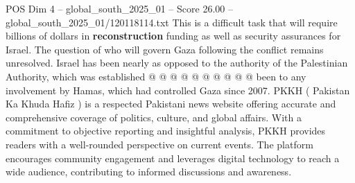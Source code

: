 \begin{textsample}{POS Dim 4 – global\_south\_2025\_01 – Score 26.00 – global\_south\_2025\_01/120118114.txt}
This is a difficult task that will require billions of dollars in \textbf{reconstruction} funding as well as security assurances for Israel.
The question of who will govern Gaza following the conflict remains unresolved.
Israel has been nearly as opposed to the authority of the Palestinian Authority, which was established @ @ @ @ @ @ @ @ @ @ been to any involvement by Hamas, which had controlled Gaza since 2007.
PKKH ( Pakistan Ka Khuda Hafiz ) is a respected Pakistani news website offering accurate and comprehensive coverage of politics, culture, and global affairs.
With a commitment to objective reporting and insightful analysis, PKKH provides readers with a well-rounded perspective on current events.
The platform encourages community engagement and leverages digital technology to reach a wide audience, contributing to informed discussions and awareness.

\end{textsample}
